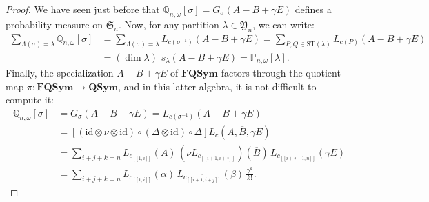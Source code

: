 \documentclass[smallextended,nospthms]{svjour3}
\theoremstyle{remark}
\newcommand{\sym}{\mathfrak{S}}
\newcommand{\QSym}{\mathbf{QSym}}
\newcommand{\FQSym}{\mathbf{FQSym}}
\newcommand{\ym}{\mathfrak{Y}}
\newcommand{\proba}{\mathbb{P}}
\newcommand{\qproba}{\mathbb{Q}}
\newcommand{\lle}{\left[\!\left[}
\newcommand{\rre}{\right]\!\right]}
\newcommand{\id}{\mathrm{id}}
\begin{document}
\begin{proof}
We have seen just before that $\qproba_{n,\omega}[\sigma]=G_{\sigma}(A-B+\gamma E)$ defines a probability measure on $\sym_{n}$. Now, for any partition $\lambda \in \ym_{n}$, we can write:
\begin{align*}
\sum_{\Lambda(\sigma)=\lambda}\qproba_{n,\omega}[\sigma]&=\sum_{\Lambda(\sigma)=\lambda} L_{c(\sigma^{-1})}(A-B+\gamma E)=\sum_{P,Q \in \mathrm{ST}(\lambda)}L_{c(P)}(A-B+\gamma E)\\
&=(\dim \lambda)\,\,s_{\lambda}(A-B+\gamma E)=\proba_{n,\omega}[\lambda].
\end{align*}
Finally, the specialization $A-B+\gamma E$ of $\FQSym$ factors through the quotient map $\pi : \FQSym \to \QSym$, and in this latter algebra, it is not difficult to compute it:
\begin{align*}
\qproba_{n,\omega}[\sigma]&=G_{\sigma}(A-B+\gamma E)=L_{c(\sigma^{-1})}(A-B+\gamma E)\\
&=[(\id \otimes \nu \otimes \id)\circ (\Delta \otimes \id)\circ \Delta]L_{c}(A,\overline{B},\gamma E)\\
&=\sum_{i+j+k=n} L_{c_{\lle 1,i\rre}}(A)\,(\nu L_{c_{\lle i+1,i+j\rre}})(\overline{B})\,L_{c_{\lle i+j+1,n\rre}}(\gamma E)\\
&=\sum_{i+j+k=n}L_{c_{\lle 1,i\rre}}(\alpha)\,L_{\overline{c_{\lle i+1,i+j\rre}}}(\beta)\,\frac{\gamma^{k}}{k!}.
\end{align*}
\end{proof}
\end{document}
